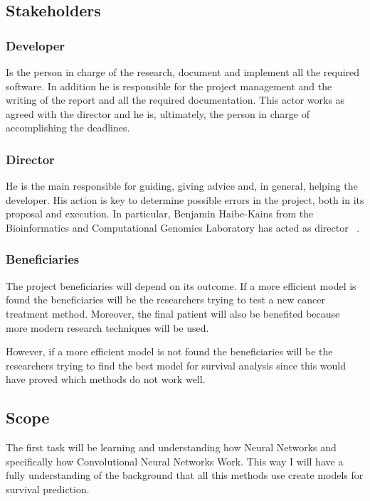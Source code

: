 \subsection{Stakeholders}

\subsubsection{Developer}
Is the person in charge of the research, document and implement all the required software.
In addition he is responsible for the project management and the writing of the report
and all the required documentation. This actor works as agreed with the director and
he is, ultimately, the person in charge of accomplishing the deadlines.

\subsubsection{Director}
He is the main responsible for guiding, giving advice and, in general, helping the developer.
His action is key to determine possible errors in the project, both in its proposal and 
execution. In particular, Benjamin Haibe-Kains from the Bioinformatics and Computational
Genomics Laboratory has acted as director
~\cites{BHKLab}.

\subsubsection{Beneficiaries}
The project beneficiaries will depend on its outcome. If a more efficient model is found the
beneficiaries will be the researchers trying to test a new cancer treatment method. Moreover,
the final patient will also be benefited because more modern research techniques will be used.

However, if a more efficient model is not found the beneficiaries will be the researchers
trying to find the best model for survival analysis since this would have proved which 
methods do not work well.

\subsection{Scope}

The first task will be learning and understanding how Neural Networks and specifically how 
Convolutional Neural Networks Work. This way I will have a fully understanding of the background
that all this methods use create models for survival prediction.

